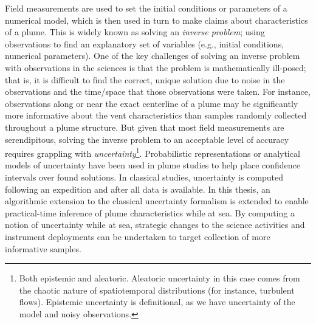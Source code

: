 

Field measurements are used to set the initial conditions or parameters of a numerical model, which is then used in turn to make claims about characteristics of a plume.
This is widely known as solving an \emph{inverse problem}; using observations to find an explanatory set of variables (e.g., initial conditions, numerical parameters).
One of the key challenges of solving an inverse problem with observations in the sciences is that the problem is mathematically ill-posed; that is, it is difficult to find the correct, unique solution due to noise in the observations and the time/space that those observations were taken.
For instance, observations along or near the exact centerline of a plume may be significantly more informative about the vent characteristics\autocite{bangian2022solution} than samples randomly collected throughout a plume structure\autocite{baker1998rise}.
But given that most field measurements are serendipitous, solving the inverse problem to an acceptable level of accuracy requires grappling with \emph{uncertainty}\footnote{Both epistemic and aleatoric. Aleatoric uncertainty in this case comes from the chaotic nature of spatiotemporal distributions (for instance, turbulent flows). Epistemic uncertainty is definitional, as we have uncertainty of the model and noisy observations.}.
Probabilistic representations or analytical models of uncertainty have been used in plume studies to help place confidence intervals over found solutions\autocite{bemis1993geothermal,sohn2019observations}.
In classical studies, uncertainty is computed following an expedition and after all data is available.
In this thesis, an algorithmic extension to the classical uncertainty formalism is extended to enable practical-time inference of plume characteristics while at sea.
By computing a notion of uncertainty while at sea, strategic changes to the science activities and instrument deployments can be undertaken to target collection of more informative samples.


